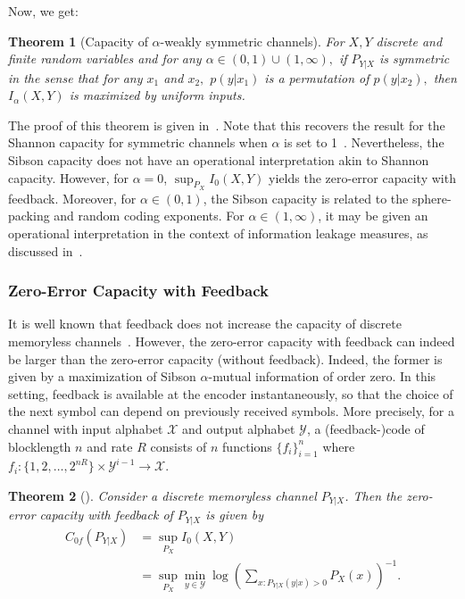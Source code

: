 \documentclass{article}
\newtheorem{theorem}{Theorem}
\numberwithin{theorem}{section}
\numberwithin{example}{section}
\numberwithin{remark}{section}
\numberwithin{definition}{section}
\newcommand{\X}{\mathcal{X}}
\newcommand{\Y}{\mathcal{Y}}
\begin{document}
Now, we get:

\begin{theorem}[Capacity of $\alpha$-weakly symmetric channels]\label{thm-symmetric-channel-cap}
    For $X,Y$ discrete and finite random variables and for any $\alpha \in (0,1)\cup (1,\infty),$
    if $P_{Y|X}$ is symmetric in the sense that for any $x_1$ and $x_2,$ $p(y|x_1)$ is a permutation of $p(y|x_2),$ then $I_\alpha(X,Y)$ is maximized by uniform inputs.
\end{theorem}

The proof of this theorem is given in~. Note that this recovers the result for the Shannon capacity for symmetric channels when $\alpha$ is set to 1~\cite{cover:2006}. Nevertheless, the Sibson capacity does not have an operational interpretation akin to Shannon capacity. However, for $\alpha = 0$, $\sup_{P_X} I_0(X,Y)$ yields the zero-error capacity with feedback. Moreover, for $\alpha \in (0,1)$, the Sibson capacity is related to the sphere-packing and random coding exponents. For $\alpha \in (1,\infty)$, it may be given an operational interpretation in the context of information leakage measures, as discussed in~.

\subsubsection{Zero-Error Capacity with Feedback}

It is well known that feedback does not increase the capacity of discrete memoryless channels~\cite{shannon:56}. However, the zero-error capacity with feedback can indeed be larger than the zero-error capacity (without feedback). Indeed, the former is given by a maximization of Sibson $\alpha$-mutual information of order zero. In this setting, feedback is available at the encoder instantaneously, so that the choice of the next symbol can depend on previously received symbols. More precisely, for a channel with input alphabet $\X$ and output alphabet $\Y$, a (feedback-)code of blocklength $n$ and rate $R$ consists of $n$ functions $\{f_i\}_{i=1}^n$ where $f_i: \{1,2,\ldots,2^{nR}\} \times \Y^{i-1} \to \X$.
\begin{theorem}[{\cite[Theorem 7]{shannon:56}}]
    \label{thm:zero-error-feedback}
    Consider a discrete memoryless channel $P_{Y|X}$. Then the zero-error capacity with feedback of $P_{Y|X}$ is given by
    \begin{align}
        C_{0f} \left( P_{Y|X} \right) &= \sup_{P_X} I_0(X,Y) \nonumber\\ &= \sup_{P_X} \min_{y \in \Y} \log \! \left(  \sum_{x: P_{Y|X}(y|x)>0} \!\! P_X(x) \right)^{-1} \!.
        \label{eq:thm-zero-error-feedback}
    \end{align}
\end{theorem}
\end{document}
